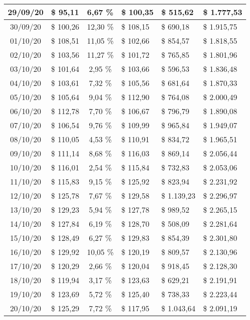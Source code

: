 \begin{center}
\begin{small}
\begin{longtable}{|c|l|c|l|l|l|}
29/09/20 & \$ 95,11 & 6,67 \% & \$ 100,35 & \$ 515,62 & \$ 1.777,53 \\ \hline
30/09/20 & \$ 100,26 & 12,30 \% & \$ 108,15 & \$ 690,18 & \$ 1.915,75 \\ \hline
01/10/20 & \$ 108,51 & 11,05 \% & \$ 102,66 & \$ 854,57 & \$ 1.818,55 \\ \hline
02/10/20 & \$ 103,56 & 11,27 \% & \$ 101,72 & \$ 765,85 & \$ 1.801,96 \\ \hline
03/10/20 & \$ 101,64 & 2,95 \% & \$ 103,66 & \$ 596,53 & \$ 1.836,48 \\ \hline
04/10/20 & \$ 103,61 & 7,32 \% & \$ 105,56 & \$ 681,64 & \$ 1.870,33 \\ \hline
05/10/20 & \$ 105,64 & 9,04 \% & \$ 112,90 & \$ 764,08 & \$ 2.000,49 \\ \hline
06/10/20 & \$ 112,78 & 7,70 \% & \$ 106,67 & \$ 796,79 & \$ 1.890,08 \\ \hline
07/10/20 & \$ 106,54 & 9,76 \% & \$ 109,99 & \$ 965,84 & \$ 1.949,07 \\ \hline
08/10/20 & \$ 110,05 & 4,53 \% & \$ 110,91 & \$ 834,72 & \$ 1.965,51 \\ \hline
09/10/20 & \$ 111,14 & 8,68 \% & \$ 116,03 & \$ 869,14 & \$ 2.056,44 \\ \hline
10/10/20 & \$ 116,01 & 2,54 \% & \$ 115,84 & \$ 732,83 & \$ 2.053,06 \\ \hline
11/10/20 & \$ 115,83 & 9,15 \% & \$ 125,92 & \$ 823,94 & \$ 2.231,92 \\ \hline
12/10/20 & \$ 125,78 & 7,67 \% & \$ 129,58 & \$ 1.139,23 & \$ 2.296,97 \\ \hline
13/10/20 & \$ 129,23 & 5,94 \% & \$ 127,78 & \$ 989,52 & \$ 2.265,15 \\ \hline
14/10/20 & \$ 127,84 & 6,19 \% & \$ 128,70 & \$ 508,09 & \$ 2.281,64 \\ \hline
15/10/20 & \$ 128,49 & 6,27 \% & \$ 129,83 & \$ 854,39 & \$ 2.301,80 \\ \hline
16/10/20 & \$ 129,92 & 10,05 \% & \$ 120,19 & \$ 809,57 & \$ 2.130,96 \\ \hline
17/10/20 & \$ 120,29 & 2,66 \% & \$ 120,04 & \$ 918,45 & \$ 2.128,30 \\ \hline
18/10/20 & \$ 119,94 & 3,17 \% & \$ 123,63 & \$ 629,21 & \$ 2.191,91 \\ \hline
19/10/20 & \$ 123,69 & 5,72 \% & \$ 125,40 & \$ 738,33 & \$ 2.223,44 \\ \hline
20/10/20 & \$ 125,29 & 7,72 \% & \$ 117,95 & \$ 1.043,64 & \$ 2.091,19 \\ \hline

\end{longtable}
\end{small}
\end{center}
